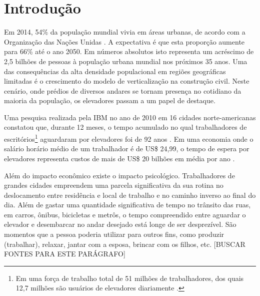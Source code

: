 \chapter{\label{chap:intro}Introdução}

Em 2014, 54\% da população mundial vivia em áreas urbanas, de acordo com a Organização das Nações Unidas \cite{UN14}. A expectativa é que esta proporção aumente para 66\% até o ano 2050. Em números absolutos isto representa um acréscimo de 2,5 bilhões de pessoas à população urbana mundial nos próximos 35 anos. Uma das consequências da alta densidade populacional em regiões geográficas limitadas é o crescimento do modelo de verticalização na construção civil. Neste cenário, onde prédios de diversos andares se tornam presença no cotidiano da maioria da população, os elevadores passam a um papel de destaque.

Uma pesquisa realizada pela IBM no ano de 2010 em 16 cidades norte-americanas constatou que, durante 12 meses, o tempo acumulado no qual trabalhadores de escritórios\footnote{Em uma força de trabalho total de 51 milhões de trabalhadores, dos quais 12,7 milhões são usuários de elevadores diariamente \cite{IBM10}.} aguardaram por elevadores foi de 92 anos \cite{IBM10}. Em uma economia onde o salário horário médio de um trabalhador é de US\$ 24,99, o tempo de espera por elevadores representa custos de mais de US\$ 20 bilhões em média por ano \cite{BLS15}.

Além do impacto econômico existe o impacto psicológico. Trabalhadores de grandes cidades empreendem uma parcela significativa da sua rotina no deslocamento entre residência e local de trabalho e no caminho inverso ao final do dia. Além de gastar uma quantidade significativa de tempo no trânsito das ruas, em carros, ônibus, bicicletas e metrôs, o tempo compreendido entre aguardar o elevador e desembarcar no andar desejado está longe de ser desprezível. São momentos que a pessoa poderia utilizar para outros fins, como produzir (trabalhar), relaxar, jantar com a esposa, brincar com os filhos, etc. {\color{red}[BUSCAR FONTES PARA ESTE PARÁGRAFO]} %

